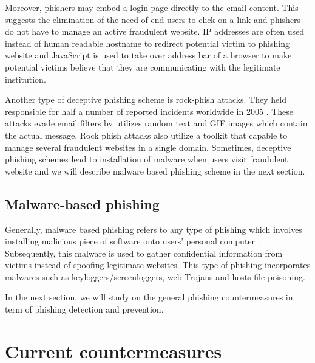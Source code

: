 Moreover, phishers may embed a login page directly to the email content.
This suggests the elimination of the need of end-users to click on
a link and phishers do not have to manage an active fraudulent website.
IP addresses are often used instead of human readable hostname to
redirect potential victim to phishing website and JavaScript is used
to take over address bar of a browser to make potential victims believe
that they are communicating with the legitimate institution. 

Another type of deceptive phishing scheme is rock-phish attacks. They
held responsible for half a number of reported incidents worldwide
in 2005 \citep{moore:2007}. These attacks evade email filters by
utilizes random text and GIF images which contain the actual message.
Rock phish attacks also utilize a toolkit that capable to manage several
fraudulent websites in a single domain. Sometimes, deceptive phishing
schemes lead to installation of malware when users visit fraudulent
website and we will describe malware based phishing scheme in the
next section. 


\subsection{Malware-based phishing}

Generally, malware based phishing refers to any type of phishing which
involves installing malicious piece of software onto users' personal
computer \citep{jakobsson:2006}. Subsequently, this malware is used
to gather confidential information from victims instead of spoofing
legitimate websites. This type of phishing incorporates malwares such
as keyloggers/screenloggers, web Trojans and hosts file poisoning.

In the next section, we will study on the general phishing countermeasures
in term of phishing detection and prevention.


\section{Current countermeasures}

